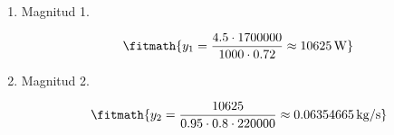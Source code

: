 \begin{enumerate}

\item Magnitud 1.

\[\fitmath{y_{1}=\frac{4.5\cdot 1700000}{1000\cdot 0.72}\approx 10625\,\mathrm{W}}\]

\item Magnitud 2.

\[\fitmath{y_{2}=\frac{10625}{0.95\cdot 0.8\cdot 220000}\approx 0.06354665\,\mathrm{kg/s}}\]

\end{enumerate}
